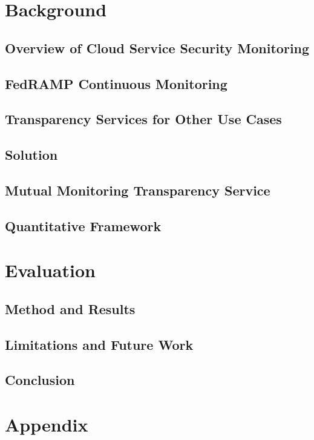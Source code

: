 \documentclass{jdf}
\begin{document}
\section{Background}

\subsection{Overview of Cloud Service Security Monitoring}

\subsection{FedRAMP Continuous Monitoring}

\subsection{Transparency Services for Other Use Cases}

\subsection{Solution}

\subsection{Mutual Monitoring Transparency Service}

\subsection{Quantitative Framework}

\section{Evaluation}

\subsection{Method and Results}

\subsection{Limitations and Future Work}

\subsection{Conclusion}

\section{Appendix}



\end{document}

